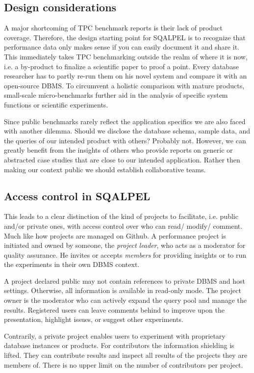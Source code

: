 \documentclass{cidr-2019}
\begin{document}
\subsection{Design considerations}
A major shortcoming of TPC benchmark reports is their lack of product coverage.
Therefore, the design starting point for {\sc SQALPEL} is to recognize that performance data only makes sense if you can easily document it and share it.
This immediately takes TPC benchmarking outside the realm of where it is now, i.e. a by-product to finalize a scientific paper to proof a point.
Every database researcher has to partly re-run them on his novel system and compare
it with an open-source DBMS.
To circumvent a holistic comparison with mature products, small-scale micro-benchmarks further aid in the analysis of specific system functions or scientific experiments. 

Since public benchmarks rarely reflect the application specifics we are also faced with another dilemma.
Should we disclose the database schema, sample data, and the queries 
of our intended product with others? Probably not. However, we can
greatly benefit from the insights of others who provide reports on generic or
abstracted case studies that are close to our intended application.
Rather then making our context public we should establish collaborative teams.

\subsection{Access control in SQALPEL}
This leads to a clear distinction of the kind of projects to facilitate, i.e.
public and/or private ones, with access control over who can read/ modify/ comment.
Much like how projects are managed on Github.
A performance project is initiated and owned by someone, the \emph{project leader}, who acts as a moderator for quality assurance. He invites or accepts \emph{members} for providing insights or  to run the experiments in their own DBMS context.

A project declared public may not contain references to private DBMS and host settings. 
Otherwise, all information is available in read-only mode. The project owner is the moderator
who can actively expand the query pool and manage the results. Registered users can leave comments behind to improve upon the presentation, highlight issues, or suggest other experiments.

Contrarily, a private project enables users to experiment with proprietary database instances or products. 
For contributors the information shielding is lifted. They can contribute results and inspect
all results of the projects they are members of. There is no upper limit on the number of contributors per project. 
\end{document}

